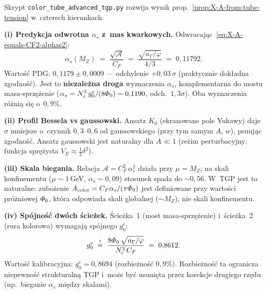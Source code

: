 \begin{remark}%
\label{rem:X-tube-advanced}
Skrypt \texttt{color\_tube\_advanced\_tgp.py} rozwija
wynik prop.~\ref{prop:X-A-from-tube-tension} w~czterech kierunkach.

\medskip\noindent
\textbf{(i) Predykcja odwrotna $\alpha_s$ z~mas kwarkowych.}
Odwracaj\k{a}c~\eqref{eq:X-A-equals-CF2-alphas2}:
\begin{equation}\label{eq:X-alpha-s-inverse}
  \alpha_s(M_Z)
  \;=\;
  \frac{\sqrt{\mathcal{A}}}{C_F}
  \;=\;
  \frac{\sqrt{a_\Gamma/\varphi}}{4/3}
  \;=\; 0{,}11792.
\end{equation}
Warto\'s\'c PDG: $0{,}1179 \pm 0{,}0009$ ---
odchylenie $+0{,}03\,\sigma$ (praktycznie dok\l{}adna zgodno\'s\'c).
Jest to \textbf{niezale\.zna droga} wyznaczenia $\alpha_s$,
komplementarna do mostu masa-sprz\k{e}\.zenie
($\alpha_s = N_c^3\,g_0^e/(8\varPhi_0) = 0{,}1190$, odch.\ $1{,}3\sigma$).
Oba wyznaczenia r\'o\.zni\k{a} si\k{e} o~$0{,}9\%$.

\medskip\noindent
\textbf{(ii) Profil Bessela vs gaussowski.}
Ansatz $K_0$ (ekranowane pole Yukawy) daje $\hat\sigma$
mniejsze o~czynnik $0{,}3$--$0{,}6$ od gaussowskiego
(przy tym samym $A$, $w$), psuuj\k{a}c zgodno\'s\'c.
Ansatz gaussowski jest naturalny dla $A \ll 1$ (re\.zim perturbacyjny:
funkcja spr\k{e}\.zysta $V_E \approx \frac{1}{2}\delta^2$).

\medskip\noindent
\textbf{(iii) Skala biegania.}
Relacja $\mathcal{A} = C_F^2\,\alpha_s^2$ dzia\l{}a przy $\mu = M_Z$;
na skali konfinementu ($\mu \sim 1$\,GeV, $\alpha_s \sim 0{,}09$)
stosunek spada do $\sim 0{,}56$. W~TGP jest to naturalne: zubo\.zenie
$A_{\rm color} = C_F\alpha_s/(\pi\varPhi_0)$ jest definiowane
przy warto\'sci pr\'o\.zniowej $\varPhi_0$, kt\'ora odpowiada
skali globalnej ($\sim M_Z$), nie skali konfinementu.

\medskip\noindent
\textbf{(iv) Sp\'ojno\'s\'c dw\'och \'scie\.zek.}
\'Scie\.zka~1 (most masa-sprz\k{e}\.zenie) i~\'scie\.zka~2 (rura kolorowa)
wymagaj\k{a} sp\'ojnego $g_0^e$:
\begin{equation}
  g_0^e
  \;\stackrel{!}{=}\;
  \frac{8\varPhi_0\,\sqrt{a_\Gamma/\varphi}}{N_c^3\,C_F}
  \;=\; 0{,}8612.
\end{equation}
Warto\'s\'c kalibracyjna: $g_0^e = 0{,}8694$ (rozbie\.zno\'s\'c $0{,}9\%$).
Rozbie\.zno\'s\'c ta ogranicza niepewno\'s\'c strukturaln\k{a} TGP
i~mo\.ze by\'c usuni\k{e}ta przez korekcje drugiego rz\k{e}du
(np.~bieganie $\alpha_s$ mi\k{e}dzy skalami).
\end{remark}

